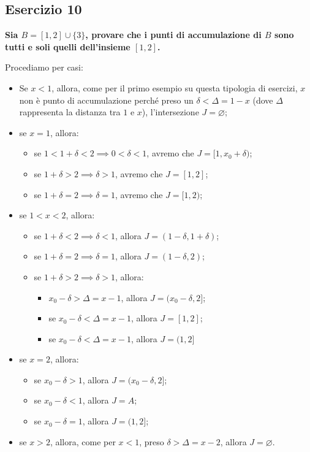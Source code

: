 \documentclass{article}
\begin{document}
\subsection{Esercizio 10}
\textbf{Sia $B = [1, 2] \cup \{3\}$, provare che i punti di accumulazione di $B$ sono tutti e soli quelli dell'insieme $[1,2]$.}

\noindent Procediamo per casi: 

\begin{itemize}
    \item Se $x < 1$, allora, come per il primo esempio su questa tipologia di esercizi, $x$ non è punto di accumulazione perché preso un $\delta < \Delta = 1 - x$ (dove $\Delta$ rappresenta la distanza tra $1$ e $x$), l'intersezione $J = \varnothing$;
    \item se $x = 1$, allora:
    \begin{itemize}
        \item se $1 < 1 + \delta < 2 \implies 0 < \delta < 1$, avremo che $J = [1, x_0 + \delta)$;
        \item se $1 + \delta > 2 \implies \delta > 1$, avremo che $J = [1, 2]$;
        \item se $1 + \delta = 2 \implies \delta = 1$, avremo che $J = [1, 2)$;
    \end{itemize}
    \item se $1 < x < 2$, allora:
    \begin{itemize}
        \item se $1 + \delta < 2 \implies \delta < 1$, allora $J = (1 - \delta, 1 + \delta)$;
        \item se $1 + \delta = 2 \implies \delta = 1$, allora $J = (1 - \delta, 2)$;
        \item se $1 + \delta > 2 \implies \delta > 1$, allora:
        \begin{itemize}
            \item $x_0 - \delta > \Delta = x - 1$, allora $J = (x_0 - \delta, 2]$;
            \item se $x_0 - \delta < \Delta = x - 1$, allora $J = [1, 2]$;
            \item se $x_0 - \delta < \Delta = x - 1$, allora $J = (1, 2]$
        \end{itemize}
    \end{itemize}
    \item se $x = 2$, allora: 
    \begin{itemize}
        \item se $x_0 - \delta > 1$, allora $J = (x_0 - \delta, 2]$;
        \item se $x_0 - \delta < 1$, allora $J = A$;
        \item se $x_0 - \delta = 1$, allora $J = (1, 2]$;
    \end{itemize}
    \item se $x > 2$, allora, come per $x < 1$, preso $\delta > \Delta = x - 2$, allora $J = \varnothing$.
\end{itemize}
\end{document}
